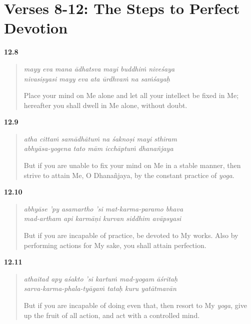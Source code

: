 \section{Verses 8-12: The Steps to Perfect Devotion}\label{sec-verses-8-12-the-steps-to-perfect-devotion}


\par\noindent\textbf{12.8}\par
\begin{verse}
\textit{mayy eva mana ādhatsva mayi buddhiṁ niveśaya} \\
\textit{nivasiṣyasi mayy eva ata ūrdhvaṁ na saṁśayaḥ}

\noindent Place your mind on Me alone and let all your intellect be fixed in Me; hereafter you shall dwell in Me alone, without doubt.
\end{verse}
\par



\par\noindent\textbf{12.9}\par
\begin{verse}
\textit{atha cittaṁ samādhātuṁ na śaknoṣi mayi sthiram} \\
\textit{abhyāsa-yogena tato mām icchāptuṁ dhanañjaya}

\noindent But if you are unable to fix your mind on Me in a stable manner, then strive to attain Me, O Dhanañjaya, by the constant practice of \textit{yoga}.
\end{verse}
\par



\par\noindent\textbf{12.10}\par
\begin{verse}
\textit{abhyāse ’py asamartho ’si mat-karma-paramo bhava} \\
\textit{mad-artham api karmāṇi kurvan siddhim avāpsyasi}

\noindent But if you are incapable of practice, be devoted to My works. Also by performing actions for My sake, you shall attain perfection.
\end{verse}
\par



\par\noindent\textbf{12.11}\par
\begin{verse}
\textit{athaitad apy aśakto ’si kartuṁ mad-yogam āśritaḥ} \\
\textit{sarva-karma-phala-tyāgaṁ tataḥ kuru yatātmavān}

\noindent But if you are incapable of doing even that, then resort to My \textit{yoga}, give up the fruit of all action, and act with a controlled mind.
\end{verse}
\par



